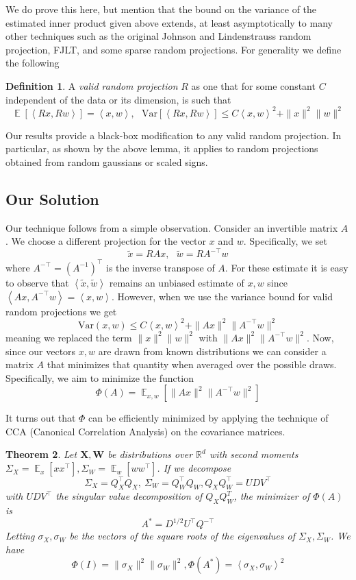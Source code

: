 \documentclass{article}
\newtheorem{theorem}{Theorem}[section]
\theoremstyle{definition}
\newtheorem{definition}[theorem]{Definition}
\theoremstyle{plain}
\newcommand{\R}{\mathbb{R}}
\newcommand{\X}{\mathbf{X}}
\newcommand{\W}{\mathbf{W}}
\newcommand{\Var}{\text{Var}}
\DeclareMathOperator{\E}{\mathbb{E}}
\newcommand{\ip}[1]{\left \langle #1 \right \rangle}
\begin{document}
We do prove this here, but mention that the bound on the variance of the estimated inner product given above extends, at least asymptotically to many other techniques such as the original Johnson and Lindenstrauss random projection, FJLT, and some sparse random projections. For generality we define the following 
\begin{definition}
A \emph{valid random projection} $R$ as one that for some constant $C$ independent of the data or its 
dimension, is such that 
$$ \E[\ip{Rx,Rw}] = \ip{x,w} , \ \ \  \Var[\ip{Rx,Rw}] \leq C \ip{x,w}^2 + \|x\|^2\|w\|^2 $$
\end{definition}
Our results provide a black-box modification to any valid random projection. In particular, as shown by the above lemma, it applies to random projections obtained from random gaussians or scaled signs.


\subsection{Our Solution}
Our technique follows from a simple observation. Consider an invertible matrix $A$. We choose a different projection for the vector $x$ and $w$. Specifically, we set 
$$ \tilde{x} = RAx, \ \ \ \tilde{w} = RA^{-\top}w $$
where $A^{-\top} = (A^{-1})^\top$ is the inverse transpose of $A$. For these estimate it is easy to observe that $\ip{\tilde{x},\tilde{w}}$ remains an unbiased estimate of $x,w$ since $\ip{Ax, A^{-\top}w}=\ip{x,w}$. However, when we use the variance bound for valid random projections we get 
$$\Var(x,w) \leq C \ip{x,w}^2 + \|Ax\|^2\|A^{-\top}w\|^2$$
meaning we replaced the term $\|x\|^2\|w\|^2$ with $\|Ax\|^2 \|A^{-\top}w\|^2$. Now, since our vectors $x,w$ are drawn from known distributions we can consider a matrix $A$ that minimizes that quantity when averaged over the possible draws. Specifically, we aim to minimize the function
$$\Phi(A) = \E_{x,w}\left[\|Ax\|^2\|A^{-\top}w\|^2\right]$$

It turns out that $\Phi$ can be efficiently minimized by applying the technique of CCA (Canonical Correlation Analysis) on the covariance matrices.

\begin{theorem} \label{thm:full}
Let $\X,\W$ be distributions over $\R^d$ with second moments $\Sigma_X=\E_x[xx^\top], \Sigma_W=\E_w[ww^\top]$. If we decompose 
$$ \Sigma_X = Q_X^\top Q_X, \ \Sigma_W = Q_W^\top Q_W, Q_XQ_W^\top = UDV^\top $$
with $UDV^\top$ the singular value decomposition of $Q_XQ_W^T$, the minimizer of $\Phi(A)$ is 
$$  A^* = D^{1/2} U^\top Q^{-\top}$$
Letting $\sigma_X, \sigma_W$ be the vectors of the square roots of the eigenvalues of $\Sigma_X, \Sigma_W$. We have
$$ \Phi(I) = \|\sigma_X\|^2 \|\sigma_W\|^2, \Phi(A^*) = \ip{\sigma_X, \sigma_W}^2 $$
\end{theorem}
\end{document}
